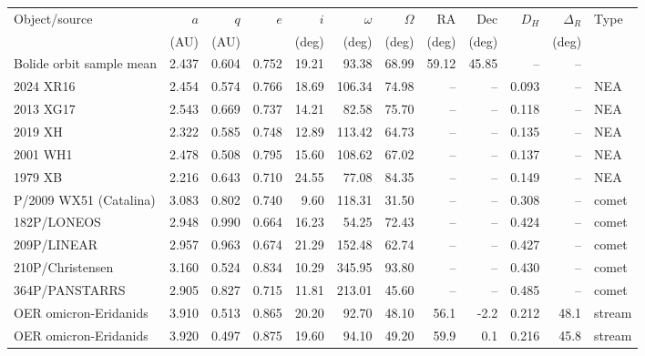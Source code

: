 \begin{tabular}{lrrrrrrrrrrl}
\toprule
Object/source & $a$ & $q$ & $e$ & $i$ & $\omega$ & $\Omega$ & RA & Dec & $D_H$ & $\Delta_R$ & Type \\
 & (AU) & (AU) & & (deg) & (deg) & (deg) & (deg) & (deg) & & (deg) & \\
\midrule
Bolide orbit sample mean & 2.437 & 0.604 & 0.752 & 19.21 & 93.38 & 68.99 & 59.12 & 45.85 & -- & -- &  \\
\midrule
2024 XR16 & 2.454 & 0.574 & 0.766 & 18.69 & 106.34 & 74.98 & -- & -- & 0.093 & -- & NEA \\
2013 XG17 & 2.543 & 0.669 & 0.737 & 14.21 & 82.58 & 75.70 & -- & -- & 0.118 & -- & NEA \\
2019 XH & 2.322 & 0.585 & 0.748 & 12.89 & 113.42 & 64.73 & -- & -- & 0.135 & -- & NEA \\
2001 WH1 & 2.478 & 0.508 & 0.795 & 15.60 & 108.62 & 67.02 & -- & -- & 0.137 & -- & NEA \\
1979 XB & 2.216 & 0.643 & 0.710 & 24.55 & 77.08 & 84.35 & -- & -- & 0.149 & -- & NEA \\
\midrule
P/2009 WX51 (Catalina) & 3.083 & 0.802 & 0.740 & 9.60 & 118.31 & 31.50 & -- & -- & 0.308 & -- & comet \\
182P/LONEOS & 2.948 & 0.990 & 0.664 & 16.23 & 54.25 & 72.43 & -- & -- & 0.424 & -- & comet \\
209P/LINEAR & 2.957 & 0.963 & 0.674 & 21.29 & 152.48 & 62.74 & -- & -- & 0.427 & -- & comet \\
210P/Christensen & 3.160 & 0.524 & 0.834 & 10.29 & 345.95 & 93.80 & -- & -- & 0.430 & -- & comet \\
364P/PANSTARRS & 2.905 & 0.827 & 0.715 & 11.81 & 213.01 & 45.60 & -- & -- & 0.485 & -- & comet \\
\midrule
OER omicron-Eridanids                        & 3.910 & 0.513 & 0.865 & 20.20 & 92.70 & 48.10 & 56.1 & -2.2 & 0.212 & 48.1 & stream \\
OER omicron-Eridanids                        & 3.920 & 0.497 & 0.875 & 19.60 & 94.10 & 49.20 & 59.9 & 0.1 & 0.216 & 45.8 & stream \\

\end{tabular}
